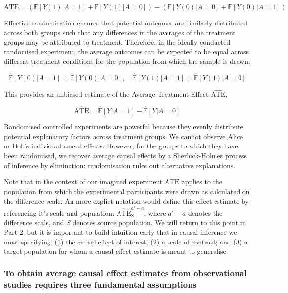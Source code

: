 \documentclass[
  single column]{article}
\begin{document}
\[
\text{ATE} = \left(\mathbb{E}[Y(1)|A = 1] + \mathbb{E}[Y(1)|A = 0]\right) - \left(\mathbb{E}[Y(0)|A = 0] + \mathbb{E}[Y(0)|A = 1]\right)
\]

Effective randomisation ensures that potential outcomes are similarly
distributed across both groups such that any differences in the averages
of the treatment groups may be attributed to treatment. Therefore, in
the ideally conducted randomised experiment, the average outcomes can be
expected to be equal across different treatment conditions for the
population from which the sample is drawn:

\[
\widehat{\mathbb{E}}[Y(0) | A = 1] = \widehat{\mathbb{E}}[Y(0) | A = 0], \quad \widehat{\mathbb{E}}[Y(1) | A = 1] = \widehat{\mathbb{E}}[Y(1) | A = 0]
\]

This provides an unbiased estimate of the Average Treatment Effect
\(\widehat{\text{ATE}}\),

\[
\widehat{\text{ATE}} = \widehat{\mathbb{E}}[Y | A = 1] - \widehat{\mathbb{E}}[Y | A = 0]
\]

Randomised controlled experiments are powerful because they evenly
distribute potential explanatory factors across treatment groups. We
cannot observe Alice or Bob's individual causal effects. However, for
the groups to which they have been randomised, we recover average causal
effects by a Sherlock-Holmes process of inference by elimination:
randomisation rules out alternative explanations.

Note that in the context of our imagined experiment
\(\widehat{\text{ATE}}\) applies to the population from which the
experimental participants were drawn as calculated on the difference
scale. An more explict notation would define this effect estimate by
referencing it's scale and population:
\(\widehat{\text{ATE}}^{a'-a}_{\text{S}}\), where \(a'-a\) denotes the
difference scale, and \(S\) denotes source population. We will return to
this point in Part 2, but it is important to build intuition early that
in causal inference we must specifying: (1) the causal effect of
interest; (2) a scale of contrast; and (3) a target population for whom
a causal effect estimate is meant to generalise.

\subsubsection{To obtain average causal effect estimates from
observational studies requires three fundamental
assumptions}\label{to-obtain-average-causal-effect-estimates-from-observational-studies-requires-three-fundamental-assumptions}
\end{document}
